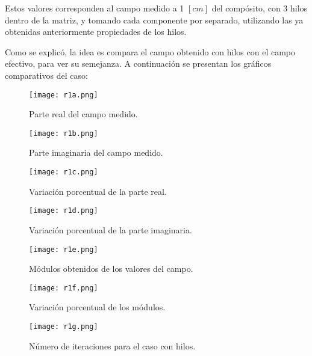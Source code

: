 \documentclass[12pt,letterpaper]{article}
\numberwithin{equation}{section}
\begin{document}
Estos valores corresponden al campo medido a 1 $[cm]$ del compósito, con 3 hilos dentro de la matriz, y tomando cada componente por separado, utilizando las ya obtenidas anteriormente propiedades de los hilos.

Como se explicó, la idea es compara el campo obtenido con hilos con el campo efectivo, para ver su semejanza. A continuación se presentan los gráficos comparativos del caso:

\begin{figure}[H]
	\centering\texttt{[image: r1a.png]}\\
	\caption{Parte real del campo medido.}
	\label{fig:r1a}
\end{figure} 

\begin{figure}[H]
	\centering\texttt{[image: r1b.png]}\\
	\caption{Parte imaginaria del campo medido.}
	\label{fig:r1b}
\end{figure} 

\begin{figure}[H]
	\centering\texttt{[image: r1c.png]}\\
	\caption{Variación porcentual de la parte real.}
	\label{fig:r1c}
\end{figure} 

\begin{figure}[H]
	\centering\texttt{[image: r1d.png]}\\
	\caption{Variación porcentual de la parte imaginaria.}
	\label{fig: r1d}
\end{figure} 

\begin{figure}[H]
	\centering\texttt{[image: r1e.png]}\\
	\caption{Módulos obtenidos de los valores del campo.}
	\label{fig:r1e}
\end{figure} 

\begin{figure}[H]
	\centering\texttt{[image: r1f.png]}\\
	\caption{Variación porcentual de los módulos.}
	\label{fig:r1f}
\end{figure} 

\begin{figure}[H]
	\centering\texttt{[image: r1g.png]}\\
	\caption{Número de iteraciones para el caso con hilos.}
	\label{fig:r1g}
\end{figure} 
\end{document}
